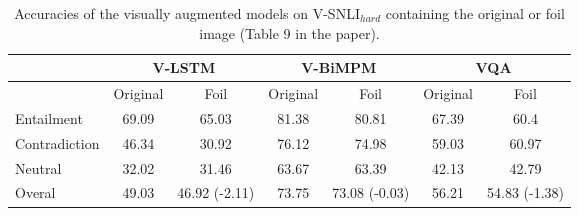\documentclass[11pt]{article}
\begin{document}
\begin{table}[!ht]
\begin{center}
\begin{tabular}{|l|cc|cc|cc|}
\hline
& \multicolumn{2}{|c|}{V-LSTM} & \multicolumn{2}{c|}{V-BiMPM} & \multicolumn{2}{c|}{VQA}\\ \hline
 & Original & Foil & Original & Foil   & Original & Foil \\\hline
Entailment & 69.09& 65.03  & 81.38  & 80.81    & 67.39& 60.4\\
Contradiction & 46.34 & 30.92 &76.12 & 74.98  & 59.03& 60.97\\
Neutral & 32.02 & 31.46  & 63.67 & 63.39   & 42.13& 42.79 \\
\hline
Overal & 49.03 &  46.92 (-2.11) & 73.75 & 73.08  (-0.03) & 56.21 &
                                                                   54.83 (-1.38) \\
\hline
\end{tabular}
\caption{Accuracies of the visually augmented models on V-SNLI$_{hard}$ containing the original or foil image (Table 9 in the paper).} \label{tab:wrongimages-supp}
\end{center}
\end{table}
\end{document}

